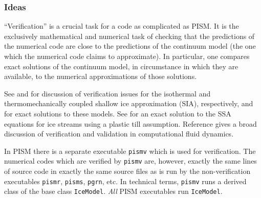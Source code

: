 \documentclass[11pt,final]{amsart}
\begin{document}
\subsubsection*{Ideas} ``Verification'' is a crucial task for a code as complicated as PISM.  It is the exclusively mathematical and numerical task of checking that the predictions of the numerical code are close to the predictions of the continuum model (the one which the numerical code claims to approximate).  In particular, one compares exact solutions of the continuum model, in circumstance in which they are available, to the numerical approximations of those solutions.

See \cite{BLKCB} and \cite{BBL} for discussion of verification issues for the isothermal and thermomechanically coupled shallow ice approximation (SIA), respectively, and for exact solutions to these models.  See \cite{SchoofStream} for an exact solution to the SSA equations for ice streams using a plastic till assumption.  Reference \cite{Roache} gives a broad discussion of verification and validation in computational fluid dynamics.

In PISM there is a separate executable \verb|pismv| which is used for verification.  The numerical codes which are verified by \verb|pismv| are, however, exactly the same lines of source code in exactly the same source files as is run by the non-verification executables \verb|pismr|, \verb|pisms|, \verb|pgrn|, etc.  In technical terms, \verb|pismv| runs a derived class of the base class \verb|IceModel|.  \emph{All} PISM executables run \verb|IceModel|.
\end{document}
